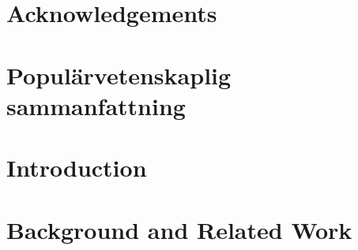 \documentclass[11pt]{book}
\begin{document}


\cleardoublepage
\setcounter{page}{1} %
\setcounter{tocdepth}{2}
\tableofcontents

\cleardoublepage
\chapter*{Acknowledgements}


\cleardoublepage
{}
\chapter*{Populärvetenskaplig sammanfattning}



\mainmatter
\setcounter{table}{0} 
\setcounter{page}{1}


\chapter{Introduction}
\label{ch:introduction}


\chapter{Background and Related Work}
\label{ch:background}

\end{document}
